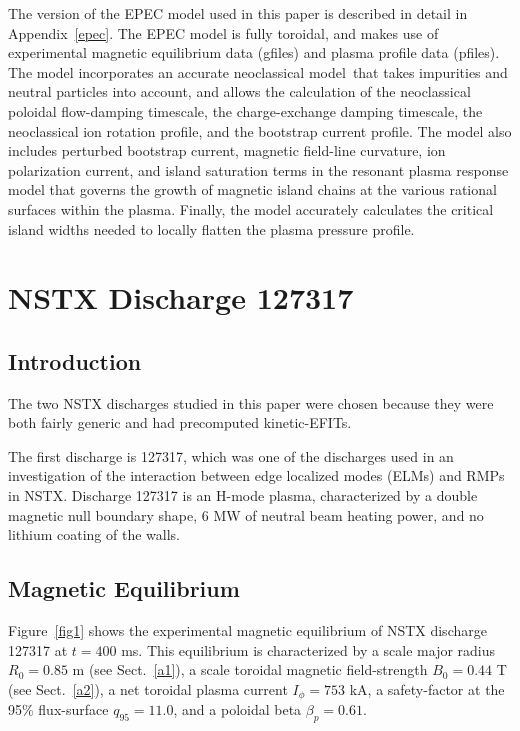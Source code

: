 \documentclass[12pt,prb,aps]{revtex4-1}
\begin{document}
The version of the EPEC model used in this paper is described in detail in Appendix~\ref{epec}. 
The EPEC model is fully toroidal, and makes use of experimental magnetic equilibrium data (gfiles)  and plasma profile data (pfiles). The model incorporates an accurate neoclassical model\,\cite{sigmar} that takes impurities and neutral particles into account, and  allows the calculation of the neoclassical poloidal flow-damping timescale, the 
charge-exchange damping timescale, the neoclassical ion rotation profile, and the bootstrap current profile. The model also includes  perturbed bootstrap current, magnetic field-line curvature, ion polarization current, and island saturation terms in the resonant plasma response model that governs the growth of magnetic island chains at the various rational surfaces within the plasma. Finally, the model accurately calculates the critical
island widths needed to locally flatten the plasma pressure profile. 

\section{NSTX Discharge 127317}
\subsection{Introduction}
The two NSTX discharges studied in this paper were chosen because they were both fairly generic and had precomputed  kinetic-EFITs. 

The first discharge  is 127317, which was one of the discharges used in an investigation of the interaction between
edge localized modes (ELMs) and RMPs in NSTX.\cite{nstx} Discharge 127317 is an H-mode plasma, characterized by a double magnetic null boundary shape,  6 MW of neutral
beam heating power, and no lithium coating of the walls. 

\subsection{Magnetic Equilibrium}
Figure~\ref{fig1} shows the experimental magnetic equilibrium of NSTX discharge 127317 at $t=400$ ms. This equilibrium is characterized by a scale major radius
$R_0=0.85$ m (see Sect.~\ref{a1}), a scale toroidal magnetic field-strength $B_0=0.44$ T (see Sect.~\ref{a2}), a net toroidal plasma current $I_\phi = 753$ kA, a safety-factor at the 95\% flux-surface $q_{95} = 11.0$, and a poloidal beta $\beta_p=0.61$. 
\end{document}
